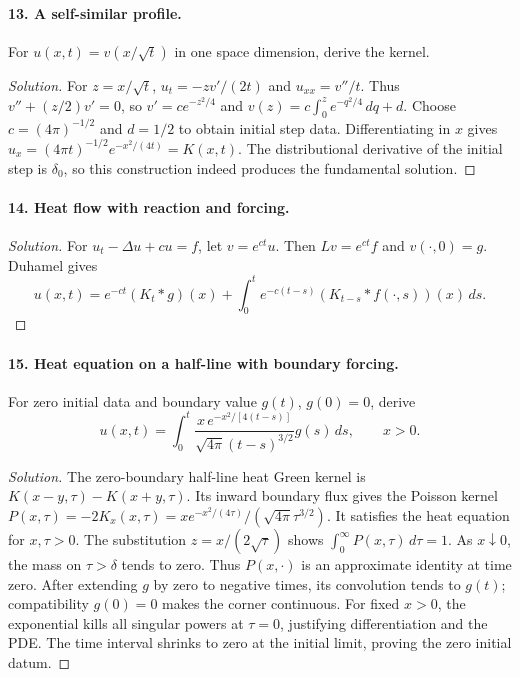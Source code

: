\paragraph{13. A self-similar profile.}
For $u(x,t)=v(x/\sqrt t)$ in one space dimension, derive the kernel.
\begin{proof}[Solution]
For $z=x/\sqrt t$, $u_t=-zv'/(2t)$ and $u_{xx}=v''/t$.
Thus $v''+(z/2)v'=0$, so $v'=c e^{-z^2/4}$ and
$v(z)=c\int_0^z e^{-q^2/4}\,dq+d$.
Choose $c=(4\pi)^{-1/2}$ and $d=1/2$ to obtain initial step data.
Differentiating in $x$ gives
$u_x=(4\pi t)^{-1/2}e^{-x^2/(4t)}=K(x,t)$.
The distributional derivative of the initial step is $\delta_0$,
so this construction indeed produces the fundamental solution.
\end{proof}

\paragraph{14. Heat flow with reaction and forcing.}
\begin{proof}[Solution]
For $u_t-\Delta u+cu=f$, let $v=e^{ct}u$.
Then $Lv=e^{ct}f$ and $v(\cdot,0)=g$. Duhamel gives
\[
 u(x,t)=e^{-ct}(K_t*g)(x)
       +\int_0^te^{-c(t-s)}(K_{t-s}*f(\cdot,s))(x)\,ds.
\]
\end{proof}

\paragraph{15. Heat equation on a half-line with boundary forcing.}
For zero initial data and boundary value $g(t)$, $g(0)=0$, derive
\[
 u(x,t)=\int_0^t
 \frac{x\,e^{-x^2/[4(t-s)]}}{\sqrt{4\pi}(t-s)^{3/2}}g(s)\,ds,\qquad x>0.
\]
\begin{proof}[Solution]
The zero-boundary half-line heat Green kernel is
$K(x-y,\tau)-K(x+y,\tau)$.
Its inward boundary flux gives the Poisson kernel
$P(x,\tau)=-2K_x(x,\tau)
=x e^{-x^2/(4\tau)}/(\sqrt{4\pi}\tau^{3/2})$.
It satisfies the heat equation for $x,\tau>0$.
The substitution $z=x/(2\sqrt\tau)$ shows
$\int_0^\infty P(x,\tau)\,d\tau=1$.
As $x\downarrow0$, the mass on $\tau>\delta$ tends to zero.
Thus $P(x,\cdot)$ is an approximate identity at time zero.
After extending $g$ by zero to negative times, its convolution tends
to $g(t)$; compatibility $g(0)=0$ makes the corner continuous.
For fixed $x>0$, the exponential kills all singular powers at
$\tau=0$, justifying differentiation and the PDE.
The time interval shrinks to zero at the initial limit, proving the
zero initial datum.
\end{proof}

